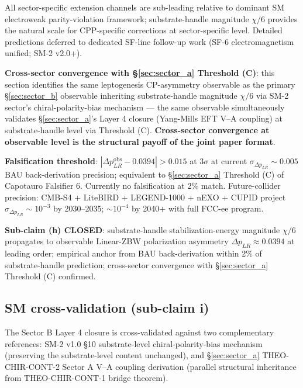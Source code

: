 \documentclass[11pt,letterpaper]{article}
\newcommand{\DeltapLR}{\Delta p_{LR}}
\begin{document}
All sector-specific extension channels are sub-leading relative to dominant SM electroweak parity-violation framework; substrate-handle magnitude $\chi/6$ provides the natural scale for CPP-specific corrections at sector-specific level. Detailed predictions deferred to dedicated SF-line follow-up work (SF-6 electromagnetism unified; SM-2 v2.0+).

\textbf{Cross-sector convergence with §\ref{sec:sector_a} Threshold (C)}: this section identifies the same leptogenesis CP-asymmetry observable as the primary §\ref{sec:sector_b} observable inheriting substrate-handle magnitude $\chi/6$ via SM-2 sector's chiral-polarity-bias mechanism --- the same observable simultaneously validates §\ref{sec:sector_a}'s Layer 4 closure (Yang-Mills EFT V--A coupling) at substrate-handle level via Threshold (C). \textbf{Cross-sector convergence at observable level is the structural payoff of the joint paper format}.

\textbf{Falsification threshold}: $|\DeltapLR^{\text{obs}} - 0.0394| > 0.015$ at $3\sigma$ at current $\sigma_{\DeltapLR} \sim 0.005$ BAU back-derivation precision; equivalent to §\ref{sec:sector_a} Threshold (C) of Capotauro Falsifier 6. Currently no falsification at 2\% match. Future-collider precision: CMB-S4 + LiteBIRD + LEGEND-1000 + nEXO + CUPID project $\sigma_{\DeltapLR} \sim 10^{-3}$ by 2030--2035; $\sim 10^{-4}$ by 2040+ with full FCC-ee program.

\textbf{Sub-claim (h) CLOSED}: substrate-handle stabilization-energy magnitude $\chi/6$ propagates to observable Linear-ZBW polarization asymmetry $\DeltapLR \approx 0.0394$ at leading order; empirical anchor from BAU back-derivation within 2\% of substrate-handle prediction; cross-sector convergence with §\ref{sec:sector_a} Threshold (C) confirmed.

\subsection{SM cross-validation (sub-claim i)}
\label{sec:sm_cross_validation}

The Sector B Layer 4 closure is cross-validated against two complementary references: SM-2 v1.0 §10 substrate-level chiral-polarity-bias mechanism (preserving the substrate-level content unchanged), and §\ref{sec:sector_a} THEO-CHIR-CONT-2 Sector A V--A coupling derivation (parallel structural inheritance from THEO-CHIR-CONT-1 bridge theorem).
\end{document}
